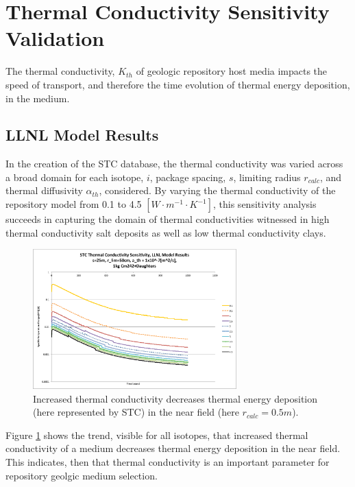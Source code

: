 \section{Thermal Conductivity Sensitivity Validation}\label{sec:conductivity}
The thermal conductivity, $K_{th}$ of geologic repository host media impacts 
the speed of transport, and therefore the time evolution of thermal energy 
deposition, in the medium. 

\FloatBarrier
\subsection{LLNL Model Results}
In the creation of the \gls{STC} database, the thermal conductivity was varied 
across a broad domain for each isotope, $i$, package spacing, $s$, limiting 
radius $r_{calc}$, and thermal diffusivity $\alpha_{th}$, considered.  By 
varying the thermal conductivity of the repository model from 0.1 to 4.5
$[W\cdot m^{-1} \cdot K^{-1}]$, this sensitivity analysis succeeds in capturing the domain of 
thermal conductivities witnessed in high thermal conductivity salt deposits as 
well as low thermal conductivity clays.

\begin{figure}[htbp!]
\begin{center}
\includegraphics[width=0.7\textwidth]{./chapters/demonstration/conductivity/Cm242kth_alpha_low.eps}
\end{center}
\caption[$K_{th}$ Sensitivity for Low $\alpha_{th}$ in LLNL Model]{Increased thermal conductivity decreases thermal energy deposition 
(here represented by \gls{STC}) in the near field (here $r_{calc} = 0.5m$).}
\label{fig:Cm242Kth_alpha_low}
\end{figure}

Figure \ref{fig:Cm242Kth_alpha_low} shows the trend, visible for all isotopes, 
that increased thermal conductivity of a medium decreases thermal energy 
deposition in the near field. This indicates, then that thermal conductivity is 
an important parameter for repository geolgic medium selection. 


